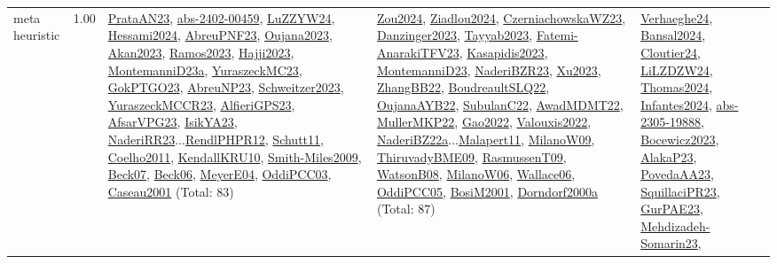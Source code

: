 {\begin{longtable}{p{3cm}r>{\raggedright\arraybackslash}p{6cm}>{\raggedright\arraybackslash}p{6cm}>{\raggedright\arraybackslash}p{8cm}}
\index{meta heuristic}\index{Algorithms!meta heuristic}meta heuristic &  1.00 & \hyperref[detail:PrataAN23]{PrataAN23}, \hyperref[detail:abs-2402-00459]{abs-2402-00459}, \hyperref[detail:LuZZYW24]{LuZZYW24}, \hyperref[detail:Hessami2024]{Hessami2024}, \hyperref[detail:AbreuPNF23]{AbreuPNF23}, \hyperref[detail:Oujana2023]{Oujana2023}, \hyperref[detail:Akan2023]{Akan2023}, \hyperref[detail:Ramos2023]{Ramos2023}, \hyperref[detail:Hajji2023]{Hajji2023}, \hyperref[detail:MontemanniD23a]{MontemanniD23a}, \hyperref[detail:YuraszeckMC23]{YuraszeckMC23}, \hyperref[detail:GokPTGO23]{GokPTGO23}, \hyperref[detail:AbreuNP23]{AbreuNP23}, \hyperref[detail:Schweitzer2023]{Schweitzer2023}, \hyperref[detail:YuraszeckMCCR23]{YuraszeckMCCR23}, \hyperref[detail:AlfieriGPS23]{AlfieriGPS23}, \hyperref[detail:AfsarVPG23]{AfsarVPG23}, \hyperref[detail:IsikYA23]{IsikYA23}, \hyperref[detail:NaderiRR23]{NaderiRR23}...\hyperref[detail:RendlPHPR12]{RendlPHPR12}, \hyperref[detail:Schutt11]{Schutt11}, \hyperref[detail:Coelho2011]{Coelho2011}, \hyperref[detail:KendallKRU10]{KendallKRU10}, \hyperref[detail:Smith-Miles2009]{Smith-Miles2009}, \hyperref[detail:Beck07]{Beck07}, \hyperref[detail:Beck06]{Beck06}, \hyperref[detail:MeyerE04]{MeyerE04}, \hyperref[detail:OddiPCC03]{OddiPCC03}, \hyperref[detail:Caseau2001]{Caseau2001} (Total: 83) & \hyperref[detail:Zou2024]{Zou2024}, \hyperref[detail:Ziadlou2024]{Ziadlou2024}, \hyperref[detail:CzerniachowskaWZ23]{CzerniachowskaWZ23}, \hyperref[detail:Danzinger2023]{Danzinger2023}, \hyperref[detail:Tayyab2023]{Tayyab2023}, \hyperref[detail:Fatemi-AnarakiTFV23]{Fatemi-AnarakiTFV23}, \hyperref[detail:Kasapidis2023]{Kasapidis2023}, \hyperref[detail:MontemanniD23]{MontemanniD23}, \hyperref[detail:NaderiBZR23]{NaderiBZR23}, \hyperref[detail:Xu2023]{Xu2023}, \hyperref[detail:ZhangBB22]{ZhangBB22}, \hyperref[detail:BoudreaultSLQ22]{BoudreaultSLQ22}, \hyperref[detail:OujanaAYB22]{OujanaAYB22}, \hyperref[detail:SubulanC22]{SubulanC22}, \hyperref[detail:AwadMDMT22]{AwadMDMT22}, \hyperref[detail:MullerMKP22]{MullerMKP22}, \hyperref[detail:Gao2022]{Gao2022}, \hyperref[detail:Valouxis2022]{Valouxis2022}, \hyperref[detail:NaderiBZ22a]{NaderiBZ22a}...\hyperref[detail:Malapert11]{Malapert11}, \hyperref[detail:MilanoW09]{MilanoW09}, \hyperref[detail:ThiruvadyBME09]{ThiruvadyBME09}, \hyperref[detail:RasmussenT09]{RasmussenT09}, \hyperref[detail:WatsonB08]{WatsonB08}, \hyperref[detail:MilanoW06]{MilanoW06}, \hyperref[detail:Wallace06]{Wallace06}, \hyperref[detail:OddiPCC05]{OddiPCC05}, \hyperref[detail:BosiM2001]{BosiM2001}, \hyperref[detail:Dorndorf2000a]{Dorndorf2000a} (Total: 87) & \hyperref[detail:Verhaeghe24]{Verhaeghe24}, \hyperref[detail:Bansal2024]{Bansal2024}, \hyperref[detail:Cloutier24]{Cloutier24}, \hyperref[detail:LiLZDZW24]{LiLZDZW24}, \hyperref[detail:Thomas2024]{Thomas2024}, \hyperref[detail:Infantes2024]{Infantes2024}, \hyperref[detail:abs-2305-19888]{abs-2305-19888}, \hyperref[detail:Bocewicz2023]{Bocewicz2023}, \hyperref[detail:AlakaP23]{AlakaP23}, \hyperref[detail:PovedaAA23]{PovedaAA23}, \hyperref[detail:SquillaciPR23]{SquillaciPR23}, \hyperref[detail:GurPAE23]{GurPAE23}, \hyperref[detail:Mehdizadeh-Somarin23]{Mehdizadeh-Somarin23}, 
\end{longtable}}
